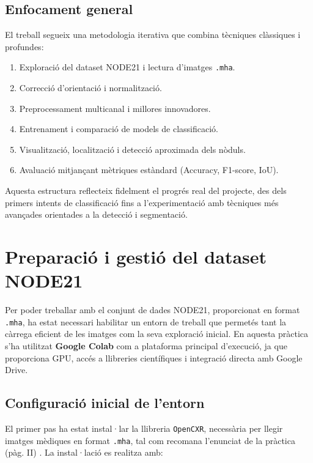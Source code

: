 \documentclass[12pt,a4paper]{article}
\begin{document}
\subsection{Enfocament general}

El treball segueix una metodologia iterativa que combina tècniques clàssiques i profundes:
\begin{enumerate}
    \item Exploració del dataset NODE21 i lectura d’imatges \texttt{.mha}.
    \item Correcció d’orientació i normalització.
    \item Preprocessament multicanal i millores innovadores.
    \item Entrenament i comparació de models de classificació.
    \item Visualització, localització i detecció aproximada dels nòduls.
    \item Avaluació mitjançant mètriques estàndard (Accuracy, F1-score, IoU).
\end{enumerate}

Aquesta estructura reflecteix fidelment el progrés real del projecte, des dels primers intents de classificació fins a l’experimentació amb tècniques més avançades orientades a la detecció i segmentació.


	
\section{Preparació i gestió del dataset NODE21}

Per poder treballar amb el conjunt de dades NODE21, proporcionat en format \texttt{.mha}, ha estat necessari habilitar un entorn de treball que permetés tant la càrrega eficient de les imatges com la seva exploració inicial. En aquesta pràctica s’ha utilitzat \textbf{Google Colab} com a plataforma principal d’execució, ja que proporciona GPU, accés a llibreries científiques i integració directa amb Google Drive.

\subsection{Configuració inicial de l’entorn}

El primer pas ha estat instal·lar la llibreria \texttt{OpenCXR}, necessària per llegir imatges mèdiques en format \texttt{.mha}, tal com recomana l’enunciat de la pràctica (pàg. II) \cite{uiaa2025}. La instal·lació es realitza amb:
\end{document}
